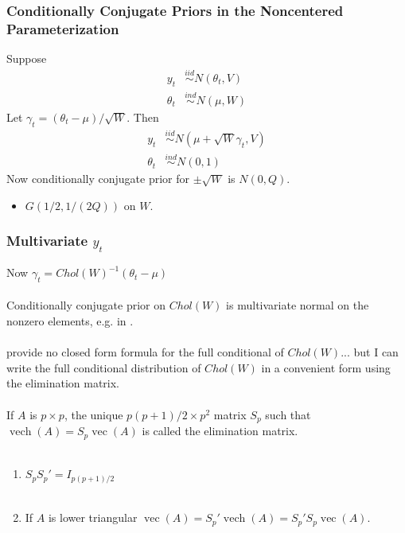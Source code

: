 \documentclass[xcolor=dvipsnames]{beamer}
\DeclareMathOperator{\vech}{vech}
\DeclareMathOperator{\vect}{vec}
\begin{document}
\begin{frame}
\frametitle{Conditionally Conjugate Priors in the Noncentered Parameterization}
Suppose
\begin{align*}
 y_t &\stackrel{iid}{\sim} N(\theta_t, V)\\
\theta_t &\stackrel{ind}{\sim} N(\mu,W)
\end{align*}
\pause
Let $\gamma_t=(\theta_t-\mu)/\sqrt{W}$. Then
\begin{align*}
 y_t &\stackrel{iid}{\sim} N(\mu + \sqrt{W}\gamma_t, V)\\
\theta_t &\stackrel{ind}{\sim} N(0,1)
\end{align*}
Now conditionally conjugate prior for $\pm \sqrt{W}$ is $N(0,Q)$.
\begin{itemize}
\item[] $G(1/2, 1/(2Q))$ on $W$.
\end{itemize}
\end{frame}

\begin{frame}
\frametitle{Multivariate $y_t$}
Now $\gamma_t = Chol(W)^{-1}(\theta_t - \mu)$\\~\\

Conditionally conjugate prior on $Chol(W)$ is multivariate normal on the nonzero elements, e.g. in \citet{fruhwirth2008bayesian}.\\~\\
\pause
\cite{fruhwirth2008bayesian} provide no closed form formula for the full conditional of $Chol(W)$... \pause but I can write the full conditional distribution of $Chol(W)$ in a convenient form using the elimination matrix. \\~\\
\pause
If $A$ is $p\times p$, the unique $p(p+1)/2\times p^2$ matrix $S_p$ such that $\vech(A) = S_p\vect(A)$ is called the elimination matrix.\\~\\

\begin{enumerate}
  \item $S_pS_p'=I_{p(p+1)/2}$\\~
  \item If $A$ is lower triangular $\vect(A) = S_p'\vech(A) = S_p'S_p\vect(A)$.\\
\end{enumerate}
\end{frame}
\end{document}
